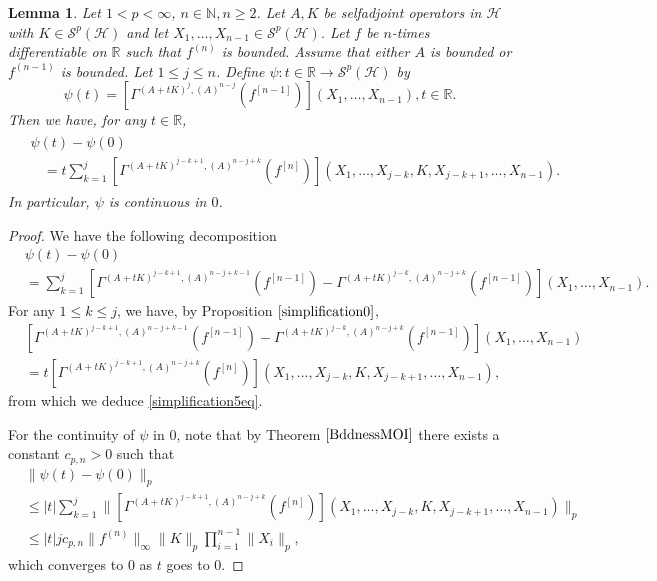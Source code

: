\documentclass[12pt]{amsart}
\newtheorem{lemma}[theorem]{Lemma}
\theoremstyle{remark}
\begin{document}
\begin{lemma}\label{simplification5}
Let $1 < p < \infty$, $n\in\mathbb{N}, n\geq 2$. Let $A, K$ be selfadjoint operators in $\mathcal{H}$ with $K\in \mathcal{S}^p(\mathcal{H})$ and let $X_1, \ldots, X_{n-1} \in \mathcal{S}^p(\mathcal{H})$. Let $f$ be $n$-times differentiable on $\mathbb{R}$ such that $f^{(n)}$ is bounded. Assume that either $A$ is bounded or $f^{(n-1)}$ is bounded. Let $1 \leq j \leq n$. Define $\psi : t\in \mathbb{R} \to \mathcal{S}^p(\mathcal{H})$ by
$$
\psi(t) = \left[ \Gamma^{(A+tK)^j, (A)^{n-j}}(f^{[n-1]}) \right](X_1, \ldots, X_{n-1}), t\in \mathbb{R}.
$$
Then we have, for any $t\in \mathbb{R}$,
\begin{align}\label{simplification5eq}
\begin{split}
& \psi(t) - \psi(0) \\
& \ \ \ \ = t \sum_{k=1}^{j} \left[ \Gamma^{(A+tK)^{j-k+1},(A)^{n-j+k}}(f^{[n]}) \right](X_1, \ldots, X_{j-k}, K, X_{j-k+1}, \ldots, X_{n-1}).
\end{split}
\end{align}
In particular, $\psi$ is continuous in $0$.
\end{lemma}


\begin{proof}
We have the following decomposition
\begin{align*}
&\psi(t) - \psi(0) \\
& = \sum_{k=1}^j \left[ \Gamma^{(A+tK)^{j-k+1},(A)^{n-j+k-1}}(f^{[n-1]}) - \Gamma^{(A+tK)^{j-k},(A)^{n-j+k}}(f^{[n-1]}) \right](X_1, \ldots, X_{n-1}).
\end{align*}
For any $1\leq k\leq j$, we have, by Proposition $\ref{simplification0}$,
\begin{align*}
& \left[ \Gamma^{(A+tK)^{j-k+1},(A)^{n-j+k-1}}(f^{[n-1]}) - \Gamma^{(A+tK)^{j-k},(A)^{n-j+k}}(f^{[n-1]}) \right](X_1, \ldots, X_{n-1}) \\
& = t \left[ \Gamma^{(A+tK)^{j-k+1},(A)^{n-j+k}}(f^{[n]}) \right](X_1, \ldots, X_{j-k}, K, X_{j-k+1}, \ldots, X_{n-1}),
\end{align*}
from which we deduce \eqref{simplification5eq}.

For the continuity of $\psi$ in $0$, note that by Theorem $\ref{BddnessMOI}$ there exists a constant $c_{p,n} > 0$ such that
\begin{align*}
& \| \psi(t) - \psi(0) \|_p \\
& \leq |t| \sum_{k=1}^{j} \| \left[ \Gamma^{(A+tK)^{j-k+1},(A)^{n-j+k}}(f^{[n]}) \right](X_1, \ldots, X_{j-k}, K, X_{j-k+1}, \ldots, X_{n-1}) \|_p \\
& \leq |t| j c_{p,n} \|f^{(n)} \|_{\infty} \|K\|_p \prod_{i=1}^{n-1} \| X_i \|_p,
\end{align*}
which converges to $0$ as $t$ goes to $0$.

\end{proof}
\end{document}
